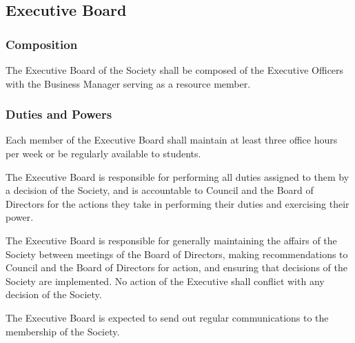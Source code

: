 \subsection{Executive Board}

\subsubsection{Composition}
The Executive Board of the Society shall be composed of the Executive Officers
with the Business Manager serving as a resource member.

\subsubsection{Duties and Powers}
Each member of the Executive Board shall maintain at least three office hours
per week or be regularly available to students.

The Executive Board is responsible for performing all duties assigned to them
by a decision of the Society, and is accountable to Council and the
Board of Directors for the actions they take in performing their duties and
exercising their power.

The Executive Board is responsible for generally maintaining the affairs of the
Society between meetings of the Board of Directors, making recommendations to
Council and the Board of Directors for action, and ensuring that
decisions of the Society are implemented.  No action of the Executive shall
conflict with any decision of the Society.

The Executive Board is expected to send out regular communications to the
membership of the Society.


